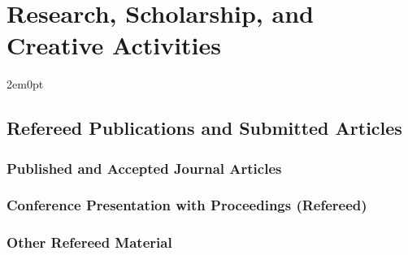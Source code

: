\section{Research, Scholarship, and Creative Activities}
\begin{adjustwidth}{2em}{0pt}

\subsection{Refereed Publications and Submitted Articles}

\nocite{*}

\subsubsection{Published and Accepted Journal Articles}

\newrefcontext[labelprefix=J]
\printbibliography[type=article,resetnumbers=true,heading=none]

\subsubsection{Conference Presentation with Proceedings (Refereed)}

\newrefcontext[labelprefix=P]
\printbibliography[type=inproceedings,resetnumbers=true,heading=none]

\subsubsection{Other Refereed Material}


\end{adjustwidth}
